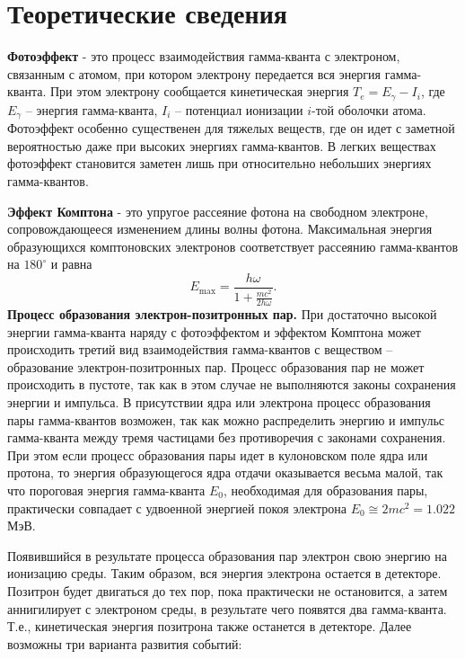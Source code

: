 	\section{Теоретические сведения}
	
	\textbf{Фотоэффект} - это процесс взаимодействия гамма-кванта с электроном, связанным с атомом, при котором электрону передается вся энергия гамма-кванта. При этом электрону сообщается кинетическая энергия $T_e=E_\gamma-I_i$, где $E_\gamma$ -- энергия гамма-кванта, $I_i$ -- потенциал ионизации $i$-той оболочки атома. Фотоэффект особенно существенен для тяжелых веществ, где он идет с заметной вероятностью даже при высоких энергиях гамма-квантов. В легких веществах фотоэффект становится заметен лишь при относительно небольших энергиях гамма-квантов.  \par
	\textbf{Эффект Комптона} - это упругое рассеяние фотона на свободном электроне, сопровождающееся изменением длины волны фотона. Максимальная энергия образующихся комптоновских электронов соответствует рассеянию гамма-квантов на $180^\circ$ и равна
	\begin{equation}
		E_{\max}=\frac{h\omega}{1+\frac{mc^2}{2h\omega}}.
	\end{equation}
	\textbf{Процесс образования электрон-позитронных пар.}
	При достаточно высокой энергии гамма-кванта наряду с фотоэффектом и эффектом Комптона может происходить третий вид взаимодействия гамма-квантов с веществом -- образование электрон-позитронных пар. Процесс образования пар не может происходить в пустоте, так как в этом случае не выполняются законы сохранения энергии и импульса. В присутствии ядра или электрона процесс образования пары гамма-квантов возможен, так как можно распределить энергию и импульс гамма-кванта между тремя частицами без противоречия с законами сохранения. При этом если процесс образования пары идет в кулоновском поле ядра или протона, то энергия образующегося ядра отдачи оказывается весьма малой, так что пороговая энергия гамма-кванта $E_0$, необходимая для образования пары, практически совпадает с удвоенной энергией покоя электрона $E_0\cong 2mc^2=1.022$ МэВ.\par
	Появившийся в результате процесса образования пар электрон свою энергию на ионизацию среды. Таким образом, вся энергия электрона остается в детекторе. Позитрон будет двигаться до тех пор, пока практически не остановится, а затем аннигилирует с электроном среды, в результате чего появятся два гамма-кванта. Т.е., кинетическая энергия позитрона также останется в детекторе. Далее возможны три варианта развития событий:
